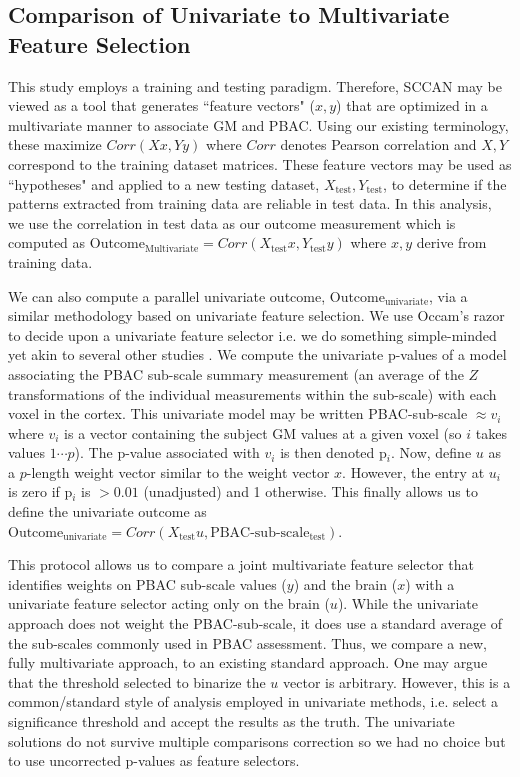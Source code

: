 \documentclass[preprint,authoryear,12pt]{elsarticle}
\begin{document}
\subsection{Comparison of Univariate to Multivariate Feature Selection}
This study employs a training and testing paradigm.  Therefore, SCCAN may be viewed as a tool that generates ``feature vectors" ($x, y$) that are optimized in a multivariate manner to associate GM and PBAC.  Using our existing terminology, these maximize $Corr( X x  , Y y )$ where $Corr$ denotes Pearson correlation and $X, Y$ correspond to the training dataset matrices.  
These feature vectors may be used as ``hypotheses" and applied to a new testing dataset, $X_\text{test}, Y_\text{test}$, to determine if the patterns extracted from training data are reliable in test data.  In this analysis, we use the correlation in test data as our outcome measurement which is computed as $\text{Outcome}_\text{Multivariate}=Corr( X_\text{test} x, Y_\text{test} y )$ where $x, y$ derive from training data. 



We can also compute a parallel univariate outcome, $\text{Outcome}_\text{univariate}$, via a similar methodology based on univariate feature selection.  We use Occam's razor to decide upon a univariate feature selector i.e. we do something simple-minded yet akin to several other studies \citet{Chen2010,dickerson_mri_2012}.  We compute the univariate p-values of a model associating the PBAC sub-scale summary measurement (an average of the $Z$ transformations of the individual measurements within the sub-scale) with each voxel in the cortex.  This univariate model may be written PBAC-sub-scale $\approx v_i$ where $v_i$ is a vector containing the subject GM values at a given voxel (so $i$ takes values $1 \cdots p$).  The p-value associated with $v_i$ is then denoted p$_i$.  Now, define $u$ as a $p$-length weight vector similar to the weight vector $x$.  However, the entry at $u_i$ is zero if p$_i$ is $>0.01$ (unadjusted) and 1 otherwise. This finally allows us to define the univariate outcome as $\text{Outcome}_\text{univariate}=Corr( X_\text{test} u , \text{PBAC-sub-scale}_\text{test} )$.   

This protocol allows us to compare a joint multivariate feature selector that identifies weights on PBAC sub-scale values ($y$) and the brain ($x$) with a univariate feature selector acting only on the brain ($u$).  While the univariate approach does not weight the PBAC-sub-scale, it does use a standard average of the sub-scales commonly used in PBAC assessment.  Thus, we compare a new, fully multivariate approach, to an existing standard approach.  One may argue that the threshold selected to binarize the $u$ vector is arbitrary.  However, this is a common/standard style of analysis employed in univariate methods, i.e. select a significance threshold and accept the results as the truth.  The univariate solutions do not survive multiple comparisons correction so we had no choice but to use uncorrected p-values as feature selectors.
\end{document}
